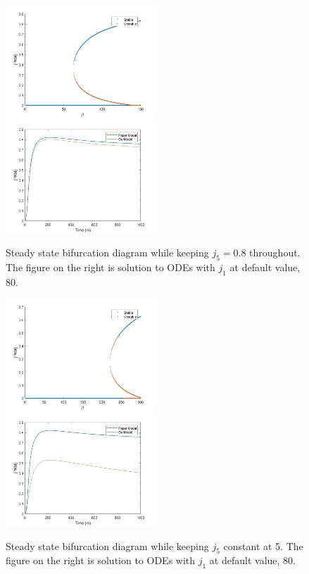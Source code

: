 \documentclass[12pt, a4paper]{article}
\begin{document}
\begin{figure}[H]
    \centering
    \includegraphics[width = 0.5\textwidth]{pics/inhibition_smallj5.jpg}
    \hspace*{-0.9em}
    \includegraphics[width = 0.5\textwidth]{pics/inhibition_smallj5ODE.jpg}
    \caption{Steady state bifurcation diagram while keeping $j_5 = 0.8$ throughout. The figure on the right is solution to ODEs with $j_1$ at default value, 80.}
    \label{fig::smallj5}
\end{figure}
\begin{figure}[H]
    \centering
    \includegraphics[width = 0.5\textwidth]{pics/inhibition_largej5.jpg}
    \hspace*{-0.9em}
    \includegraphics[width = 0.5\textwidth]{pics/inhibition_largej5ODE.jpg}
    \caption{Steady state bifurcation diagram while keeping $j_5$ constant at 5. The figure on the right is solution to ODEs with $j_1$ at default value, 80.}
    \label{fig:largej5}
\end{figure}
\end{document}

